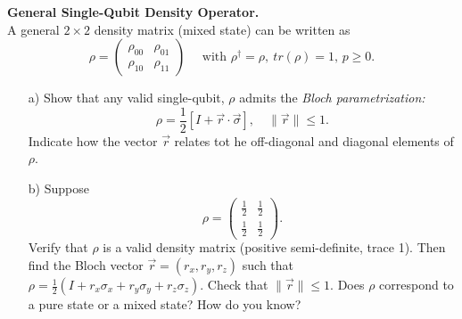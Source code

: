 \documentclass{article}
\begin{document}
\begin{question}
    \textbf{General Single-Qubit Density Operator.}\\
    A general $2 \times 2$ density matrix (mixed state) can be written as
    $$ \rho =\begin{pmatrix}
        \rho_{00} & \rho_{01} \\
        \rho_{10} & \rho_{11}
    \end{pmatrix} \quad \text{ with } \rho^\dagger=\rho, \ tr(\rho)=1, \, p \geq 0.$$
    \begin{enumerate}
        \item[a)] Show that any valid single-qubit, $\rho$ admits the \textit{Bloch parametrization:} $$\rho=\frac{1}{2}\left[I+\vec{r} \cdot\vec{\sigma}\right], \quad \|\vec{r}\| \leq 1.$$ Indicate how the vector $\vec{r}$ relates tot he off-diagonal and diagonal elements of $\rho$.
        \item[b)] Suppose  
        $$ \rho =\begin{pmatrix}
        \frac{1}{2} & \frac{1}{2} \\
        \frac{1}{2} & \frac{1}{2}
        \end{pmatrix}.$$ Verify that $\rho$ is a valid density matrix (positive semi-definite, trace 1). Then find the Bloch vector $\vec{r}=(r_x,r_y,r_z)$ such that $\rho=\frac{1}{2}(I+r_x\sigma_x+r_y\sigma_y+r_z\sigma_z).$ Check that $\|\vec{r}\| \leq1.$ Does $\rho$ correspond to a pure state or a mixed state? How do you know?
    \end{enumerate}
\end{question}
\end{document}
